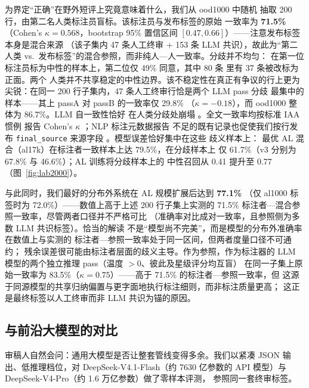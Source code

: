 \documentclass[11pt,a4paper]{article}
\newcommand{\code}[1]{\texttt{#1}}
\begin{document}
为界定“正确”在野外短评上究竟意味着什么，我们从 ood1000 中随机
抽取 200 行，由第二名人类标注员盲标。该标注员与发布标签的原始
一致率为 \textbf{71.5\%}（Cohen's $\kappa = 0.568$，bootstrap
95\% 置信区间 $[0.47, 0.66]$）——注意发布标签本身是混合来源
（该子集内 47 条人工终审 + 153 条 LLM 共识），故此为“第二人类
vs.\ 发布标签”的混合参照，而非纯人—人一致率。分歧并不均匀：
在第一位标注员标为中性的样本上，第二位仅 49\% 同意，其中 80 条
里有 37 条被改标为正面。两个
人类并不共享稳定的中性边界。该不稳定性在真正有争议的行上更为
尖锐：在同一 200 行子集内，47 条人工终审行恰是两个 LLM pass 分歧
最集中的样本——其上 passA 对 passB 的一致率仅 29.8\%
（$\kappa = -0.18$），而 ood1000 整体为 86.7\%。LLM 自一致性恰好
在人类分歧处崩塌 \citep{davani2022}。全文一致率均按标准 IAA 惯例
报告 Cohen's $\kappa$ \citep{artstein2008}；NLP 标注元数据报告
不足的既有记录也促使我们按行发布 \code{final\_source} 来源字段
\citep{kunilovskaya2026,alkhalifa2026}。模型误差恰好集中在这些
歧义样本上：
最优 AL 混合（al17k）在标注者一致样本上达 79.5\%，在分歧样本上
仅 61.7\%（v3 分别为 67.8\% 与 46.6\%）；AL 训练将分歧样本上的
中性召回从 0.41 提升至 0.77（图~\ref{fig:lab2000}）。

与此同时，我们最好的分布外系统在 AL 规模扩展后达到 \textbf{77.1\%}
（仅 al1000 标签时为 72.0\%）——数值上高于上述 200 行子集上实测的
71.5\% 标注者—混合参照一致率，尽管两者口径并不严格可比
（准确率对比成对一致率，且参照侧为多数 LLM 共识标签）。恰当的解读
不是“模型尚不完美”，而是模型的分布外准确率在数值上与实测的
标注者—参照一致率处于同一区间，但两者度量口径不可通约；
残余误差很可能由标注者层面的歧义主导。作为参照，作为标注器的
LLM 模型的两个独立推理 pass（温度 $>0$、彼此及星级评分均互盲）
在同一子集上原始一致率为
83.5\%（$\kappa = 0.75$）——高于 71.5\% 的标注者—参照一致率，但
这源于同源模型的共享归纳偏置与更字面地执行标注细则，而非标注质量更高；
这正是最终标签以人工终审而非 LLM 共识为锚的原因。

\subsection{与前沿大模型的对比}
\label{sec:llm}

审稿人自然会问：通用大模型是否让整套管线变得多余。我们以紧凑
JSON 输出、低推理档位，对 DeepSeek-V4.1-Flash（约 7630 亿参数的
API 模型）与 DeepSeek-V4-Pro（约 1.6 万亿参数）做了零样本评测，
参照同一套终审标签。
\end{document}
